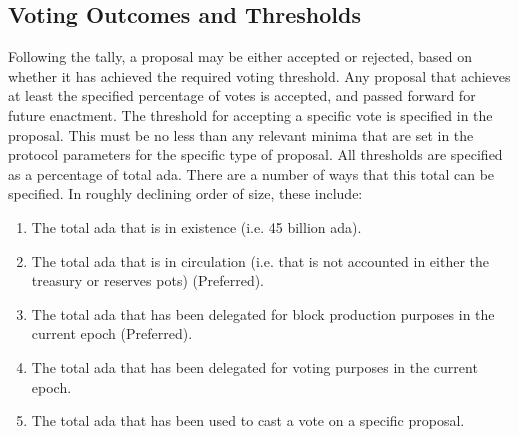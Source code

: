 \subsection{Voting Outcomes and Thresholds}

Following the tally, a proposal may be either accepted or rejected, based on whether it has achieved the required voting threshold.  Any proposal that achieves at least
the specified percentage of votes is accepted, and passed forward for future enactment.
The threshold for accepting a specific vote is specified in the proposal.
This must be no less than any relevant minima that are set in the protocol parameters for the specific type of proposal.
All thresholds are specified as a percentage of total ada.  There are a number of ways that this total can be specified.  In roughly declining order of size, these include:

\begin{enumerate}
\item
  The total ada that is in existence (i.e. 45 billion ada).
\item
  The total ada that is in circulation (i.e. that is not accounted in either the treasury or reserves pots) (Preferred).
\item
  The total ada that has been delegated for block production purposes in the current epoch (Preferred).
\item
  The total ada that has been delegated for voting purposes in the current epoch.
\item
  The total ada that has been used to cast a vote on a specific proposal.
\end{enumerate}



